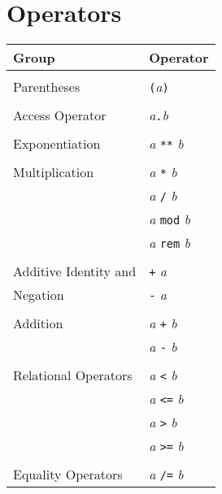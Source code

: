 \section{Operators}

\begin{table}[htbp]
\small
\centering
\begin{tabular}{ll}
\textbf{Group}           &\textbf{Operator}                   \\
[1ex]\hline\\[-1.5ex]
Parentheses              &\texttt{(}\textit{a}\texttt{)}      \\
[1ex]\hline\\[-1.5ex]
Access Operator          &\textit{a}\texttt{.}\textit{b}      \\
[1ex]\hline\\[-1.5ex]
Exponentiation           &\textit{a} \texttt{**} \textit{b}   \\
[1ex]\hline\\[-1.5ex]
Multiplication           &\textit{a} \texttt{*} \textit{b}    \\
                         &\textit{a} \texttt{/} \textit{b}    \\
                         &\textit{a} \texttt{mod} \textit{b}  \\
                         &\textit{a} \texttt{rem} \textit{b}  \\
[1ex]\hline\\[-1.5ex]
Additive Identity and    &\texttt{+} \textit{a}               \\
Negation                 &\texttt{-} \textit{a}               \\
[1ex]\hline\\[-1.5ex]
Addition                 &\textit{a} \texttt{+} \textit{b}    \\
                         &\textit{a} \texttt{-} \textit{b}    \\
[1ex]\hline\\[-1.5ex]
Relational Operators     &\textit{a} \texttt{<} \textit{b}    \\
                         &\textit{a} \texttt{<=} \textit{b}   \\
                         &\textit{a} \texttt{>} \textit{b}    \\
                         &\textit{a} \texttt{>=} \textit{b}   \\
[1ex]\hline\\[-1.5ex]
Equality Operators       &\textit{a} \texttt{/=} \textit{b}   \\

\end{tabular}
\end{table}
